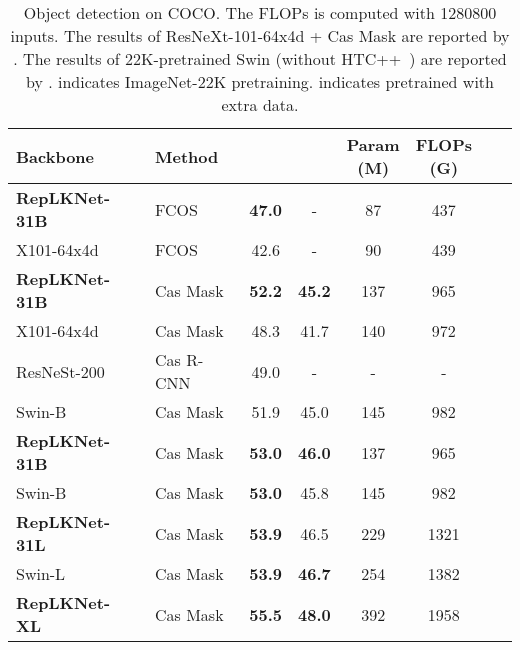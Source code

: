 \documentclass[10pt,twocolumn,letterpaper]{article}
\begin{document}
	\setlength{\tabcolsep}{2pt}
	\begin{table}
		\caption{Object detection on COCO. The FLOPs is computed with 1280800 inputs. The results of ResNeXt-101-64x4d + Cas Mask are reported by \cite{swin}. The results of 22K-pretrained Swin (without HTC++~\cite{swin}) are reported by \cite{liu2022convnet}.  indicates ImageNet-22K pretraining.  indicates pretrained with extra data.}
		\label{table-coco}
		\vspace{-0.25in}
		\begin{center}		
			\small
			\begin{tabular}{llcccccc}
				\hline
				Backbone				&	Method	&	 &	   &\makecell{Param \\ (M)}	& \makecell{FLOPs \\ (G)}		\\
				\hline
				\textbf{RepLKNet-31B}    &   FCOS    &   \textbf{47.0}   &   -   &   87  &   437\\
				X101-64x4d                  &   FCOS    &    42.6   &   -   &   90  &   439 \\
				\hline
				\textbf{RepLKNet-31B}	&	Cas Mask 	&	\textbf{52.2}    &   \textbf{45.2}   &   137    &   965    \\
				X101-64x4d		&	Cas Mask 	&	48.3    &   41.7   &  140		&	972\\
				ResNeSt-200		&	Cas R-CNN \cite{cai2019cascade}	&	49.0    &   -	&	- & -	\\				
				Swin-B      	&	Cas Mask 	&	51.9    &   45.0    &   145    &   982    \\
				\hline
				\textbf{RepLKNet-31B}~	&	Cas Mask 	&	\textbf{53.0}    &   \textbf{46.0}   &   137    &   965       \\
				Swin-B~	                &	Cas Mask 	&	\textbf{53.0}    &   45.8            &   145    &   982\\
				\hline
				\textbf{RepLKNet-31L}~ & Cas Mask  & \textbf{53.9}    & 46.5  &   229 &   1321\\
				Swin-L~     & Cas Mask  & \textbf{53.9}  &   \textbf{46.7}    &   254   &   1382  \\
				\hline
				\textbf{RepLKNet-XL}~ & Cas Mask & \textbf{55.5} & \textbf{48.0} &   392 &   1958 \\ 
				\hline
			\end{tabular}
		\end{center}
		\vspace{-0.35in}
	\end{table}
	
	
\end{document}

